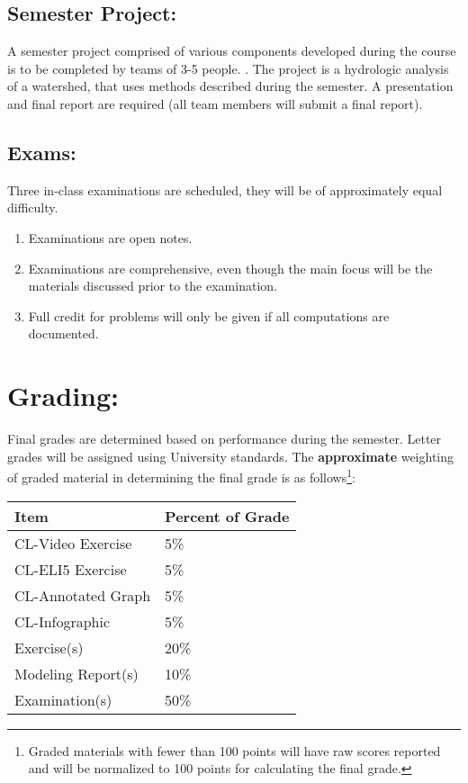 \documentclass[12pt]{article}
\begin{document}
\subsection*{Semester Project:}  
A semester project comprised of various components developed during the course is to be completed by teams of 3-5 people.  .  
The project is a hydrologic analysis of a watershed, that uses methods described during the semester. 
A presentation and final report are required (all team members will submit a final report).

\subsection*{Exams:} Three in-class examinations are scheduled, they will be of approximately equal difficulty.  
\begin{enumerate}
\item Examinations are open notes.
\item Examinations are comprehensive, even though the main focus will be the materials discussed prior to the examination.
\item Full credit for problems will only be given if all computations are documented.
\end{enumerate}

\section*{Grading:} Final grades are determined based on performance during the semester.  Letter grades will be assigned using University standards.  The \textbf{approximate} weighting of graded material in determining the final grade is as follows\footnote{Graded materials with fewer than 100 points will have raw scores reported and will be normalized to 100 points for calculating the final grade.}:
\begin{table}[h!]
   \centering
   \begin{tabular}{l l}
Item & Percent of Grade \\
\hline
\hline
CL-Video Exercise & 5\% \\
CL-ELI5 Exercise & 5\% \\
CL-Annotated Graph & 5\% \\
CL-Infographic & 5\% \\
Exercise(s) & 20\% \\
Modeling Report(s) & 10\% \\
Examination(s) & 50\% \\
\hline
\end{tabular}
\end{table}
\end{document}
